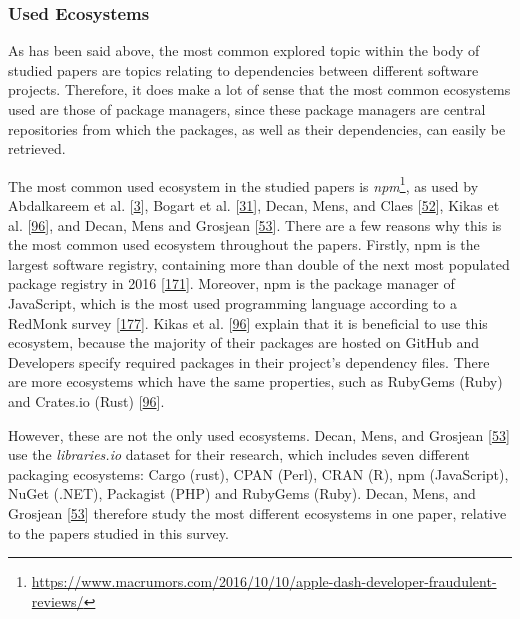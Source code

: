 \documentclass[]{book}
\let\rmarkdownfootnote\footnote%
\def\footnote{\protect\rmarkdownfootnote}
\begin{document}
\subsubsection{Used Ecosystems}\label{used-ecosystems}

As has been said above, the most common explored topic within the body
of studied papers are topics relating to dependencies between different
software projects. Therefore, it does make a lot of sense that the most
common ecosystems used are those of package managers, since these
package managers are central repositories from which the packages, as
well as their dependencies, can easily be retrieved.

The most common used ecosystem in the studied papers is
\emph{npm}\footnote{\url{https://www.macrumors.com/2016/10/10/apple-dash-developer-fraudulent-reviews/}},
as used by Abdalkareem et al.
{[}\protect\hyperlink{ref-Abdalkareem2017}{3}{]}, Bogart et al.
{[}\protect\hyperlink{ref-Bogart2016}{31}{]}, Decan, Mens, and Claes
{[}\protect\hyperlink{ref-Decan2017}{52}{]}, Kikas et al.
{[}\protect\hyperlink{ref-Kikas2017}{96}{]}, and Decan, Mens and
Grosjean {[}\protect\hyperlink{ref-Decan2018}{53}{]}. There are a few
reasons why this is the most common used ecosystem throughout the
papers. Firstly, npm is the largest software registry, containing more
than double of the next most populated package registry in 2016
{[}\protect\hyperlink{ref-Linux2016}{171}{]}. Moreover, npm is the
package manager of JavaScript, which is the most used programming
language according to a RedMonk survey
{[}\protect\hyperlink{ref-RedMonk2018}{177}{]}. Kikas et al.
{[}\protect\hyperlink{ref-Kikas2017}{96}{]} explain that it is
beneficial to use this ecosystem, because the majority of their packages
are hosted on GitHub and Developers specify required packages in their
project's dependency files. There are more ecosystems which have the
same properties, such as RubyGems (Ruby) and Crates.io (Rust)
{[}\protect\hyperlink{ref-Kikas2017}{96}{]}.

However, these are not the only used ecosystems. Decan, Mens, and
Grosjean {[}\protect\hyperlink{ref-Decan2018}{53}{]} use the
\emph{libraries.io} dataset for their research, which includes seven
different packaging ecosystems: Cargo (rust), CPAN (Perl), CRAN (R), npm
(JavaScript), NuGet (.NET), Packagist (PHP) and RubyGems (Ruby). Decan,
Mens, and Grosjean {[}\protect\hyperlink{ref-Decan2018}{53}{]} therefore
study the most different ecosystems in one paper, relative to the papers
studied in this survey.
\end{document}
